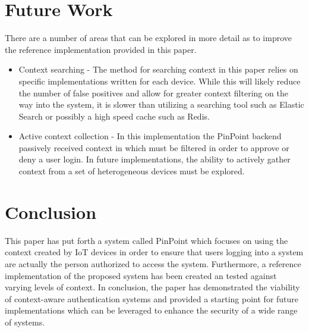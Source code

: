 \documentclass[11pt,journal]{IEEEtran}
\begin{document}
\section{Future Work}
There are a number of areas that can be explored in more detail as to improve the reference implementation provided in this paper.

\begin{itemize}
	\item Context searching - The method for searching context in this paper relies on specific implementations written for each device.  While this will likely reduce the number of false positives and allow for greater context filtering on the way into the system, it is slower than utilizing a searching tool such as Elastic Search or possibly a high speed cache such as Redis.  
	\item Active context collection - In this implementation the PinPoint backend passively received context in which must be filtered in order to approve or deny a user login.  In future implementations, the ability to actively gather context from a set of heterogeneous devices must be explored.
\end{itemize}

\section{Conclusion}

This paper has put forth a system called PinPoint which focuses on using the context created by IoT devices in order to ensure that users logging into a system are actually the person authorized to access the system. Furthermore, a reference implementation of the proposed system has been created an tested against varying levels of context.  In conclusion, the paper has demonstrated the viability of context-aware authentication systems and provided a starting point for future implementations which can be leveraged to enhance the security of a wide range of systems.




\end{document}
